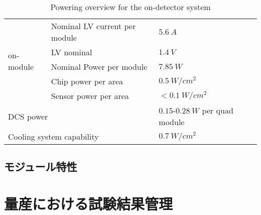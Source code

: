 \begin{table}[htbp]
  \begin{center}
    \caption[Powering overview for the on-detector system]{Powering overview for the on-detector system\cite{itk}}
    \label{tab:powering}
    \begin{tabular}{|l|l|l|}
    \hline
      \multirow{5}{*}{on-module} & Nominal LV current per module & $5.6\ \si{A}$ \\
    \cline{2-3}
      & LV nominal & $1.4\ \si{V}$ \\
    \cline{2-3}
      & Nominal Power per module & $7.85\ \si{W}$ \\
    \cline{2-3}
     & Chip power per area & $0.5\ \si{W/cm^2}$ \\
    \cline{2-3}
     & Sensor power per area & $< 0.1\ \si{W/cm^2}$ \\
    \hline
     \multicolumn{2}{|l|}{DCS power} & $0.15$-$0.28\ \si{W}$ per quad module \\
    \hline
     \multicolumn{2}{|l|}{Cooling system capability} & $0.7\ \si{W/cm^2}$ \\
    \hline
    \end{tabular}
  \end{center}
\end{table}


\subsection{モジュール特性}





\section{量産における試験結果管理}
\label{sec:}



\newpage
